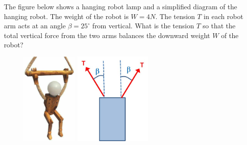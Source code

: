 
The figure below shows a hanging robot lamp and a simplified diagram of the hanging robot. The weight of the robot is $W = 4N$. The tension $T$ in each robot arm acts at an angle $\beta = 25^\circ$ from vertical. What is the tension $T$ so that the total vertical force from the two arms balances the downward weight $W$ of the robot?

\begin{figure}[ht!]
  \centering
  \includegraphics[height=1.8in]{robot-lamp.png}
  \includegraphics[height=1.8in]{robot-lamp-diagram.png}
\end{figure}

